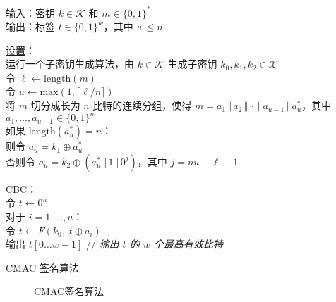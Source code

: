 \begin{table}
	\hspace*{5pt} 输入：密钥 $k\in\mathcal{K}$ 和 $m\in\{0,1\}^*$\\
	\hspace*{26pt} 输出：标签 $t\in\{0,1\}^w$，其中 $w\leq n$

	\vspace{3pt}

	\hspace*{5pt} \underline{设置}：\\
	\hspace*{26pt} 运行一个子密钥生成算法，由 $k\in\mathcal{K}$ 生成子密钥 $k_0,k_1,k_2\in\mathcal{X}$\\
	\hspace*{26pt} 令 $\ell\leftarrow\mathrm{length}(m)$\\
	\hspace*{26pt} 令 $u\leftarrow\mathrm{max}(1,\lceil\ell/n\rceil)$\\
	\hspace*{26pt} 将 $m$ 切分成长为 $n$ 比特的连续分组，使得 $m=a_1\,\Vert\,a_2\,\Vert\,\cdot\,\Vert\,a_{u-1}\,\Vert\,a_u^*$，其中 $a_1,\dots,a_{u-1}\in\{0,1\}^n$\\
	\hspace*{26pt} 如果 $\mathrm{length}(a_u^*)=n$：\\
	\hspace*{50pt} 则令 $a_u=k_1\oplus a_u^*$\\
	\hspace*{50pt} 否则令 $a_u=k_2\oplus(a_u^*\,\Vert\,1\,\Vert\,0^j)$，其中 $j=nu-\ell-1$
	
	\vspace{3pt}
	
	\hspace*{5pt} \underline{CBC}：\\
	\hspace*{26pt} 令 $t\leftarrow0^n$\\
	\hspace*{26pt} 对于 $i=1,\dots,u$：\\
	\hspace*{50pt} 令 $t\leftarrow F(k_0,\;t\oplus a_i)$\\
	\hspace*{26pt} 输出 $t[0\dots w-1]$ \quad\quad\quad\quad\quad // \emph{输出 $t$ 的 $w$ 个最高有效比特}
  \caption{CMAC 签名算法}
  \label{tab:6-1}
\end{table}

\begin{figure}
  \centering
  \quad
  \subfigure[其他情况]{
    
  }
  \caption{CMAC签名算法}
  \label{fig:6-8}
\end{figure}

